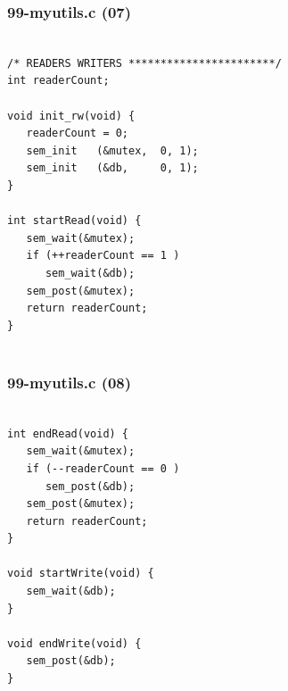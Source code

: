 \documentclass[xcolor=table, notheorems, hyperref={pdfpagelabels=false}]{beamer}
\begin{document}
\begin{frame}[fragile]
\frametitle{99-myutils.c (07)}
\begin{lstlisting}[basicstyle=\ttfamily\large]        %  54

/* READERS WRITERS ***********************/
int readerCount;

void init_rw(void) {
   readerCount = 0;
   sem_init   (&mutex,  0, 1);
   sem_init   (&db,     0, 1);
}

int startRead(void) {
   sem_wait(&mutex);
   if (++readerCount == 1 )
      sem_wait(&db);
   sem_post(&mutex);
   return readerCount;
} 


\end{lstlisting}
\end{frame}

\begin{frame}[fragile]
\frametitle{99-myutils.c (08)}
\begin{lstlisting}[basicstyle=\ttfamily\large]        %  54

int endRead(void) {
   sem_wait(&mutex);
   if (--readerCount == 0 )
      sem_post(&db);
   sem_post(&mutex);
   return readerCount;
} 

void startWrite(void) {
   sem_wait(&db);
}

void endWrite(void) {
   sem_post(&db);
}

\end{lstlisting}
\end{frame}

\end{document}
